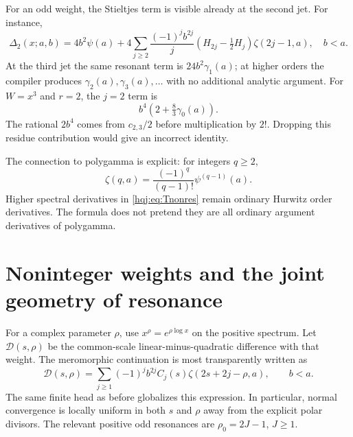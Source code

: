 \documentclass[11pt,letterpaper]{article}
\numberwithin{equation}{section}
\theoremstyle{definition}
\begin{document}
For an odd weight, the Stieltjes term is visible already at the second
jet. For instance,
\begin{equation}\label{hqj:eq:xsecond}
\Delta_2(x;a,b)=4b^2\psi(a)+
4\sum_{j\ge2}\frac{(-1)^jb^{2j}}j
\left(H_{2j}-\tfrac12H_j\right)\zeta(2j-1,a),\quad b<a.
\end{equation}
At the third jet the same resonant term is
$24b^2\gamma_1(a)$; at higher orders the compiler produces
$\gamma_2(a),\gamma_3(a),\ldots$ with no additional analytic argument.
For $W=x^3$ and $r=2$, the $j=2$ term is
\[
b^4\left(2+\tfrac83\gamma_0(a)\right).
\]
The rational $2b^4$ comes from $c_{2,3}/2$ before multiplication by $2!$.
Dropping this residue contribution would give an incorrect identity.

The connection to polygamma is explicit: for integers $q\ge2$,
\begin{equation}\label{hqj:eq:polygamma-zeta}
\zeta(q,a)=\frac{(-1)^q}{(q-1)!}\psi^{(q-1)}(a).
\end{equation}
Higher spectral derivatives in \eqref{hqj:eq:Tnonres} remain ordinary
Hurwitz order derivatives. The formula does not pretend they are all
ordinary argument derivatives of polygamma.


\section{Noninteger weights and the joint geometry of resonance}
\label{hqj:sec:rho}

For a complex parameter $\rho$, use $x^\rho=e^{\rho\log x}$ on the
positive spectrum. Let $\mathcal D(s,\rho)$ be the common-scale
linear-minus-quadratic difference with that weight. The meromorphic
continuation is most transparently written as
\begin{equation}\label{hqj:eq:rho-master}
\mathcal D(s,\rho)=\sum_{j\ge1}(-1)^jb^{2j}
C_j(s)\zeta(2s+2j-\rho,a),\qquad b<a.
\end{equation}
The same finite head as before globalizes this expression. In
particular, normal convergence is locally uniform in both $s$ and
$\rho$ away from the explicit polar divisors. The relevant positive
odd resonances are $\rho_0=2J-1$, $J\ge1$.
\end{document}
